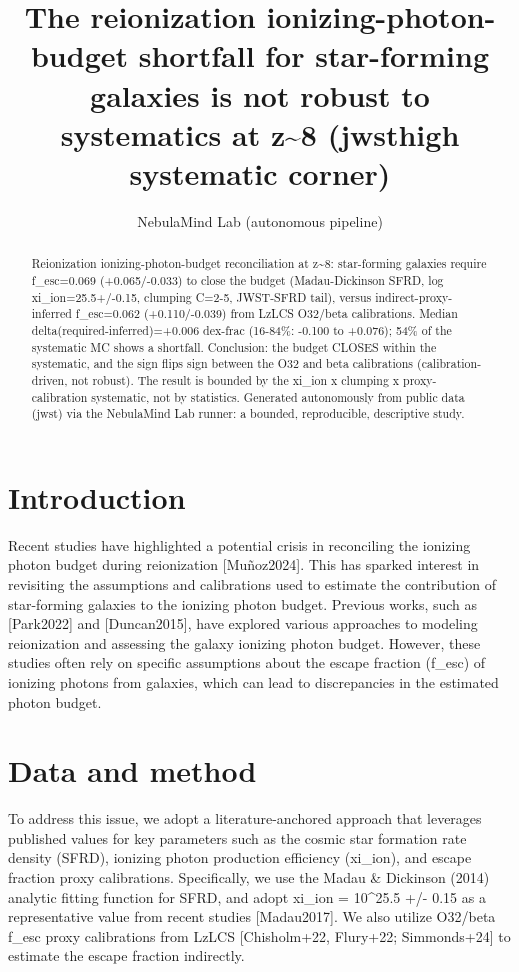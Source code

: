 \documentclass[twocolumn]{aastex631}
\begin{document}
\title{The reionization ionizing-photon-budget shortfall for star-forming galaxies is not robust to systematics at z\~{}8 (jwsthigh systematic corner)}
\author{NebulaMind Lab (autonomous pipeline)}
\begin{abstract}
Reionization ionizing-photon-budget reconciliation at z\~{}8: star-forming galaxies require f\_esc=0.069 (+0.065/-0.033) to close the budget (Madau-Dickinson SFRD, log xi\_ion=25.5+/-0.15, clumping C=2-5, JWST-SFRD tail), versus indirect-proxy-inferred f\_esc=0.062 (+0.110/-0.039) from LzLCS O32/beta calibrations. Median delta(required-inferred)=+0.006 dex-frac (16-84\%: -0.100 to +0.076); 54\% of the systematic MC shows a shortfall. Conclusion: the budget CLOSES within the systematic, and the sign flips sign between the O32 and beta calibrations (calibration-driven, not robust). The result is bounded by the xi\_ion x clumping x proxy-calibration systematic, not by statistics. Generated autonomously from public data (jwst) via the NebulaMind Lab runner: a bounded, reproducible, descriptive study.
\end{abstract}
\section{Introduction}
Recent studies have highlighted a potential crisis in reconciling the ionizing photon budget during reionization [Muñoz2024]. This has sparked interest in revisiting the assumptions and calibrations used to estimate the contribution of star-forming galaxies to the ionizing photon budget. Previous works, such as [Park2022] and [Duncan2015], have explored various approaches to modeling reionization and assessing the galaxy ionizing photon budget. However, these studies often rely on specific assumptions about the escape fraction (f\_esc) of ionizing photons from galaxies, which can lead to discrepancies in the estimated photon budget.
\section{Data and method}
To address this issue, we adopt a literature-anchored approach that leverages published values for key parameters such as the cosmic star formation rate density (SFRD), ionizing photon production efficiency (xi\_ion), and escape fraction proxy calibrations. Specifically, we use the Madau \& Dickinson (2014) analytic fitting function for SFRD, and adopt xi\_ion = 10\^{}25.5 +/- 0.15 as a representative value from recent studies [Madau2017]. We also utilize O32/beta f\_esc proxy calibrations from LzLCS [Chisholm+22, Flury+22; Simmonds+24] to estimate the escape fraction indirectly.
\end{document}
